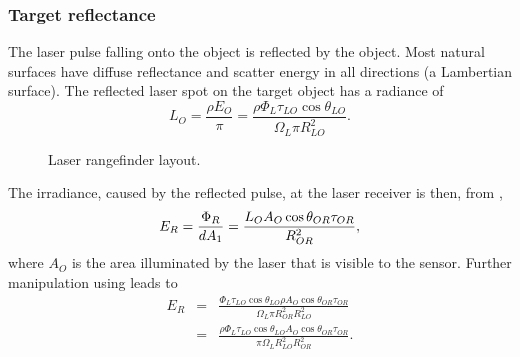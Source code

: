 \subsubsection{Target reflectance}
\noindent
The laser pulse falling onto the object is reflected by the object. Most
natural surfaces have diffuse reflectance and scatter energy in all
directions (a Lambertian surface). The reflected laser spot on the target object has a radiance of
\begin{equation}
L_O=\frac{\rho E_O}{\pi}=\frac{\rho\Phi_L \tau_{LO}\cos\theta_{LO}}{\Omega_L
\pi R^2_{LO}}.\label{loo}
\end{equation}

\begin{figure}[t]
    \centering
    \caption{Laser rangefinder layout.
    \label{rangelay}}
    \end{figure}
    

The irradiance, caused by the reflected pulse, at the laser receiver is then, from ,
\begin{equation}
E_R=\frac{\Phi_R}{d A_1}=\frac{L_O A_O \cos\theta_{OR}\tau_{OR}}{R_{OR}^2},
\end{equation}
where $A_O$ is the area illuminated by the laser that is visible to the
sensor. Further manipulation using  leads to
\begin{eqnarray}
E_R&=&\frac{\Phi_L \tau_{LO}\cos\theta_{LO}\rho A_O \cos\theta_{OR}\tau_{OR}}
{\Omega_L \pi R^2_{OR}R^2_{LO}}\nonumber \\
&=&\frac{
\rho \Phi_L \tau_{LO} \cos\theta_{LO} A_O \cos\theta_{OR} \tau_{OR}
}{
\pi \Omega_L R^2_{LO}R^2_{OR}
}.
\end{eqnarray}

